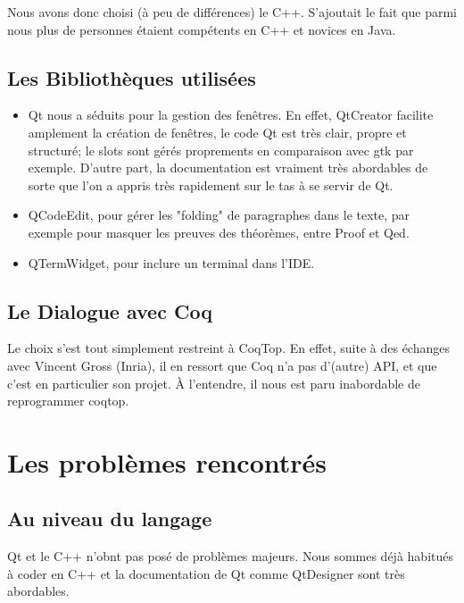 		Nous avons donc choisi (à peu de différences) le C++. S'ajoutait le fait que parmi nous plus de personnes étaient compétents en C++ et novices en Java.
    
    \subsection{Les Bibliothèques utilisées}
    
		\begin{itemize} 
			\item Qt nous a séduits pour la gestion des fenêtres.
				En effet, QtCreator facilite amplement la création de fenêtres, le code Qt est très clair, propre et structuré; le slots sont gérés proprements en comparaison avec gtk par exemple.
				D'autre part, la documentation est vraiment très abordables de sorte que l'on a appris très rapidement sur le tas à se servir de Qt.
				
			\item QCodeEdit, pour gérer les "folding" de paragraphes dans le texte, par exemple pour masquer les preuves des théorèmes, entre Proof et Qed.
			
			\item QTermWidget, pour inclure un terminal dans l'IDE.	
		\end{itemize}
		
    \subsection{Le Dialogue avec Coq}
    
		Le choix s'est tout simplement restreint à CoqTop. 
		En effet, suite à des échanges avec Vincent Gross (Inria), il en ressort que Coq n'a pas d'(autre) API, et que c'est en particulier son projet. À l'entendre, il nous est paru inabordable de reprogrammer coqtop. 
        
\section{Les problèmes rencontrés}

    \subsection{Au niveau du langage}
    
		Qt et le C++ n'obnt pas posé de problèmes majeurs. Nous sommes déjà habitués à coder en C++ et la documentation de Qt comme QtDesigner sont très abordables.
        

